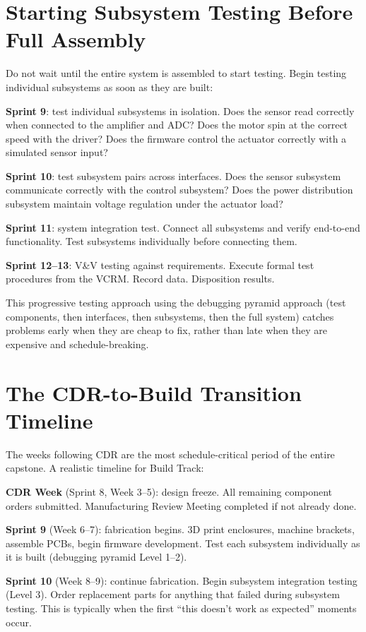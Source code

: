 \section{Starting Subsystem Testing Before Full Assembly}
Do not wait until the entire system is assembled to start testing. Begin testing individual subsystems as soon as they are built:

\textbf{Sprint 9}: test individual subsystems in isolation. Does the sensor read correctly when connected to the amplifier and ADC? Does the motor spin at the correct speed with the driver? Does the firmware control the actuator correctly with a simulated sensor input?

\textbf{Sprint 10}: test subsystem pairs across interfaces. Does the sensor subsystem communicate correctly with the control subsystem? Does the power distribution subsystem maintain voltage regulation under the actuator load?

\textbf{Sprint 11}: system integration test. Connect all subsystems and verify end-to-end functionality. Test subsystems individually before connecting them.

\textbf{Sprint 12--13}: V\&V testing against requirements. Execute formal test procedures from the VCRM. Record data. Disposition results.

This progressive testing approach using the debugging pyramid approach (test components, then interfaces, then subsystems, then the full system) catches problems early when they are cheap to fix, rather than late when they are expensive and schedule-breaking.



\section{The CDR-to-Build Transition Timeline}
The weeks following CDR are the most schedule-critical period of the entire capstone. A realistic timeline for Build Track:

\textbf{CDR Week} (Sprint 8, Week 3--5): design freeze. All remaining component orders submitted. Manufacturing Review Meeting completed if not already done.

\textbf{Sprint 9} (Week 6--7): fabrication begins. 3D print enclosures, machine brackets, assemble PCBs, begin firmware development. Test each subsystem individually as it is built (debugging pyramid Level 1--2).

\textbf{Sprint 10} (Week 8--9): continue fabrication. Begin subsystem integration testing (Level 3). Order replacement parts for anything that failed during subsystem testing. This is typically when the first ``this doesn't work as expected'' moments occur.

